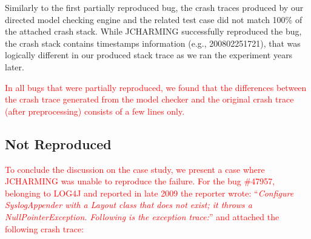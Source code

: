 \documentclass[times, doublespace]{smrauth}
\newcommand{\red}[1]{\textcolor{red}{#1}}
\begin{document}
\vspace*{0.3cm}

Similarly to the first partially reproduced bug, the crash traces produced by our
directed model checking engine and the related test case did not match 100\% of
the attached crash stack.
While JCHARMING successfully reproduced the bug, the crash stack contains
timestamps information (e.g., 200802251721),
that was logically different in our produced stack trace as we ran the experiment
years later.

\red{In all bugs that were partially reproduced, we found that the
differences between the crash trace generated from the model
checker and the original crash trace (after preprocessing)
consists of a few lines only.}

\subsection{Not Reproduced}

\red{To conclude the discussion on the case study, we present a
case where JCHARMING was unable to reproduce the failure.
For the bug \#47957, belonging to LOG4J and reported in late
2009 the reporter wrote: ``{\it Configure SyslogAppender with a Layout class that does not
exist; it throws a NullPointerException. Following is the
exception trace:}'' and attached the following crash trace:}

\vspace*{0.3cm}

\noindent{}
\end{document}

